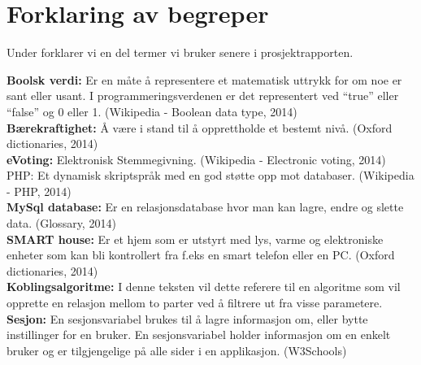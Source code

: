 \section*{Forklaring av begreper}

Under forklarer vi en del termer vi bruker senere i prosjektrapporten.

{\bf Boolsk verdi:} Er en måte å representere et matematisk uttrykk for om noe er sant eller usant. I programmeringsverdenen er det representert ved ``true'' eller ``false'' og 0 eller 1. (Wikipedia - Boolean data type, 2014)\citep{website:wiki_boolean}\\

{\bf Bærekraftighet:} Å være i stand til å opprettholde et bestemt nivå. (Oxford dictionaries, 2014)\citep{website:sustainable}\\

{\bf eVoting:} Elektronisk Stemmegivning. (Wikipedia - Electronic voting, 2014)
PHP:  Et dynamisk skriptspråk med en god støtte opp mot databaser. (Wikipedia - PHP, 2014)\citep{website:wiki_evoting}\\

{\bf MySql database:} Er en relasjonsdatabase hvor man kan lagre, endre og slette data. (Glossary, 2014)\\

{\bf SMART house:} Er et hjem som er utstyrt med lys, varme og elektroniske enheter som kan bli kontrollert fra f.eks en smart telefon eller en PC. (Oxford dictionaries, 2014)\citep{website:smarthome}\\

{\bf Koblingsalgoritme:}  I denne teksten vil dette referere til en algoritme som vil opprette en relasjon mellom to parter ved å filtrere ut fra visse parametere.\\

{\bf Sesjon:} En sesjonsvariabel brukes til å lagre informasjon om, eller bytte instillinger for en bruker. En sesjonsvariabel holder informasjon om en enkelt bruker og er tilgjengelige på alle sider i en applikasjon. (W3Schools)\citep{website:sessionvariable}

